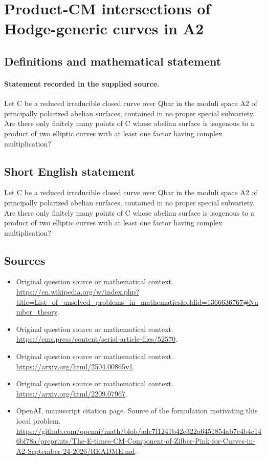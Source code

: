 \documentclass[11pt]{article}
\begin{document}
\section*{Product-CM intersections of Hodge-generic curves in A2}\label{statement}
\subsection{Definitions and mathematical statement}
\paragraph{Statement recorded in the supplied source.}
Let C be a reduced irreducible closed curve over Qbar in the moduli space A2 of principally polarized abelian surfaces, contained in no proper special subvariety. Are there only finitely many points of C whose abelian surface is isogenous to a product of two elliptic curves with at least one factor having complex multiplication?
\subsection{Short English statement}
Let C be a reduced irreducible closed curve over Qbar in the moduli space A2 of principally polarized abelian surfaces, contained in no proper special subvariety. Are there only finitely many points of C whose abelian surface is isogenous to a product of two elliptic curves with at least one factor having complex multiplication?
\subsection{Sources}
\begin{itemize}
\item[S1] Original question source or mathematical context.
\url{https://en.wikipedia.org/w/index.php?title=List_of_unsolved_problems_in_mathematics&oldid=1366636767#Number_theory}.
\item[S2] Original question source or mathematical context.
\url{https://ems.press/content/serial-article-files/52570}.
\item[S3] Original question source or mathematical context.
\url{https://arxiv.org/html/2504.00865v1}.
\item[S4] Original question source or mathematical context.
\url{https://arxiv.org/html/2209.07967}.
\item[S5] OpenAI, manuscript citation page. Source of the formulation motivating this local problem.
\url{https://github.com/openai/math/blob/adc7f1241b42e322a6451854ab7e4b4c146bf78a/preprints/The-E-times-CM-Component-of-Zilber-Pink-for-Curves-in-A2-September-24-2026/README.md}.
\end{itemize}
\end{document}
